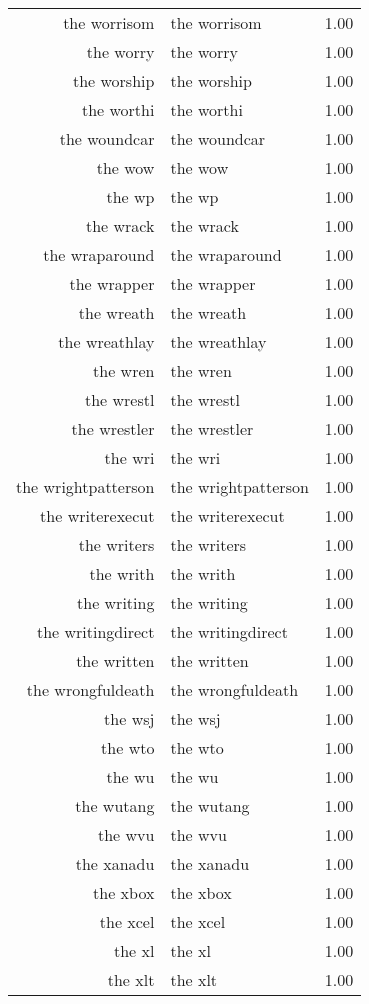 \begin{table}[ht]
\begin{tabular}{rlr}
  the worrisom & the worrisom & 1.00 \\ 
  the worry & the worry & 1.00 \\ 
  the worship & the worship & 1.00 \\ 
  the worthi & the worthi & 1.00 \\ 
  the woundcar & the woundcar & 1.00 \\ 
  the wow & the wow & 1.00 \\ 
  the wp & the wp & 1.00 \\ 
  the wrack & the wrack & 1.00 \\ 
  the wraparound & the wraparound & 1.00 \\ 
  the wrapper & the wrapper & 1.00 \\ 
  the wreath & the wreath & 1.00 \\ 
  the wreathlay & the wreathlay & 1.00 \\ 
  the wren & the wren & 1.00 \\ 
  the wrestl & the wrestl & 1.00 \\ 
  the wrestler & the wrestler & 1.00 \\ 
  the wri & the wri & 1.00 \\ 
  the wrightpatterson & the wrightpatterson & 1.00 \\ 
  the writerexecut & the writerexecut & 1.00 \\ 
  the writers & the writers & 1.00 \\ 
  the writh & the writh & 1.00 \\ 
  the writing & the writing & 1.00 \\ 
  the writingdirect & the writingdirect & 1.00 \\ 
  the written & the written & 1.00 \\ 
  the wrongfuldeath & the wrongfuldeath & 1.00 \\ 
  the wsj & the wsj & 1.00 \\ 
  the wto & the wto & 1.00 \\ 
  the wu & the wu & 1.00 \\ 
  the wutang & the wutang & 1.00 \\ 
  the wvu & the wvu & 1.00 \\ 
  the xanadu & the xanadu & 1.00 \\ 
  the xbox & the xbox & 1.00 \\ 
  the xcel & the xcel & 1.00 \\ 
  the xl & the xl & 1.00 \\ 
  the xlt & the xlt & 1.00 \\ 

\end{tabular}
\end{table}

